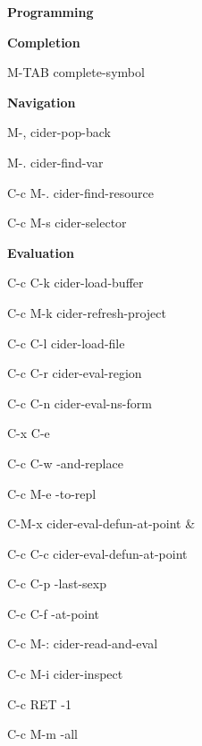 \documentclass[a4paper,10pt]{article}
\renewcommand\section[1]{\bigskip\par\textbf{\large#1}\medskip}
\renewcommand\subsection[1]{\medskip\par\textbf{#1}\medskip}
\newcommand\keyify[1]{\keys{\ttfamily#1}}
\begin{document}
\begin{multicols}{2}

\section{Programming}
\subsection{Completion}

\begin{keylist}[labelwidth=\widthof{\keyify{C-c C-c}}]
  \item[M-TAB] complete-symbol
\end{keylist}

\subsection{Navigation}
\begin{keylist}[labelwidth=\widthof{\keyify{C-c M-.}}]
  \item[M-,] cider-pop-back
  \item[M-.] cider-find-var
  \item[C-c M-.] cider-find-resource
  \item[C-c M-s] cider-selector
\end{keylist}

\subsection{Evaluation}
\begin{keylist}[labelwidth=\widthof{\keyify{C-c RET}}]
  \item[C-c C-k] cider-load-buffer
  \item[C-c M-k] cider-refresh-project
  \item[C-c C-l] cider-load-file
  \item[C-c C-r] cider-eval-region
  \item[C-c C-n] cider-eval-ns-form
  \item[C-x C-e] 
  \item[C-c C-w] \ns                     -and-replace
  \item[C-c M-e] \ns                     -to-repl
  \item[C-M-x]   cider-eval-defun-at-point
\&\item[C-c C-c] cider-eval-defun-at-point
  \item[C-c C-p] -last-sexp
  \item[C-c C-f] \ns                   -at-point
  \item[C-c M-:] cider-read-and-eval
  \item[C-c M-i] cider-inspect
  \item[C-c RET] -1
  \item[C-c M-m] \ns                   -all
\end{keylist}


\end{multicols}
\end{document}
